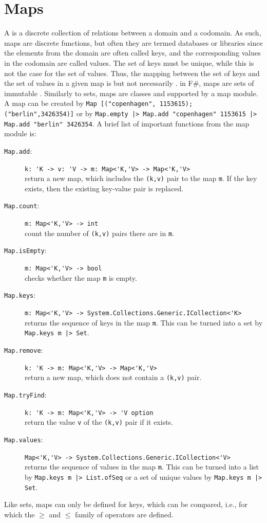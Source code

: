 \documentclass[fsharpNotes.tex]{subfiles}
\begin{document}
\section{Maps}
A  is a discrete collection of relations between a domain and a codomain. As such, maps are discrete functions, but often they are termed databases or libraries since the elements from the domain are often called keys, and the corresponding values in the codomain are called values. The set of keys must be unique, while this is not the case for the set of values. Thus, the mapping between the set of keys and the set of values in a given map is  but not necessarily . in F\#, maps are sets of immutable . Similarly to sets, maps are classes and supported by a map module. A map can be created by \lstinline{Map [("copenhagen", 1153615); ("berlin",3426354)]} or by \lstinline{Map.empty |> Map.add "copenhagen" 1153615 |> Map.add "berlin" 3426354}. A brief list of important functions from the map module is:
\begin{description}
\item[\texttt{Map.add}:] \lstinline{k: 'K -> v: 'V -> m: Map<'K,'V> -> Map<'K,'V>}~\\ return a new map, which includes the \lstinline{(k,v)} pair to the map \lstinline{m}. If the key exists, then the existing key-value pair is replaced.
\item[\texttt{Map.count}:] \lstinline{m: Map<'K,'V> -> int}~\\ count the number of \lstinline{(k,v)} pairs there are in \lstinline{m}.
\item[\texttt{Map.isEmpty}:] \lstinline{m: Map<'K,'V> -> bool}~\\ checks whether the map \lstinline{m} is empty.
\item[\texttt{Map.keys}:] \lstinline{m: Map<'K,'V> -> System.Collections.Generic.ICollection<'K>}~\\ returns the sequence of keys in the map \lstinline{m}. This can be turned into a set by \lstinline{Map.keys m |> Set}.
\item[\texttt{Map.remove}:] \lstinline{k: 'K -> m: Map<'K,'V> -> Map<'K,'V>}~\\ return a new map, which does not contain a \lstinline{(k,v)} pair.
\item[\texttt{Map.tryFind}:] \lstinline{k: 'K -> m: Map<'K,'V> -> 'V option}~\\ return the value \lstinline{v} of the \lstinline{(k,v)} pair if it exists.
\item[\texttt{Map.values}:] \lstinline{Map<'K,'V> -> System.Collections.Generic.ICollection<'V>}~\\returns the sequence of values in the map \lstinline{m}. This can be turned into a list by \lstinline{Map.keys m |> List.ofSeq} or a set of unique values by \lstinline{Map.keys m |> Set}.
\end{description}
Like sets, maps can only be defined for keys, which can be compared, i.e., for which the $\ge$ and $\le$ family of operators are defined.
\end{document}
